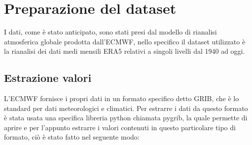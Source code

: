 \section{Preparazione del dataset}
I dati, come è stato anticipato, sono stati presi dal modello di rianalisi atmosferica globale prodotta dall'ECMWF, nello specifico il dataset utilizzato è la rianalisi dei dati medi mensili ERA5 relativi a singoli livelli dal 1940 ad oggi.
\subsection{Estrazione valori}
L'ECMWF fornisce i propri dati in un formato specifico detto GRIB, che è lo standard per dati meteorologici e climatici. Per estrarre i dati da questo formato è stata usata una specifica libreria python chiamata pygrib, la quale permette di aprire e per l'appunto estrarre i valori contenuti in questo particolare tipo di formato, ciò è stato fatto nel seguente modo:

